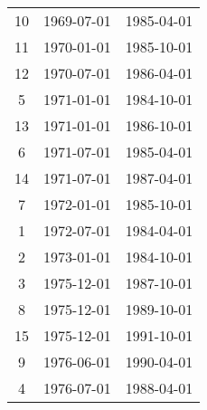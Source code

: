% 
\begin{tabular}{ccc}
  \hline
  \hline
10 & 1969-07-01 & 1985-04-01 \\ 
  11 & 1970-01-01 & 1985-10-01 \\ 
  12 & 1970-07-01 & 1986-04-01 \\ 
  5 & 1971-01-01 & 1984-10-01 \\ 
  13 & 1971-01-01 & 1986-10-01 \\ 
  6 & 1971-07-01 & 1985-04-01 \\ 
  14 & 1971-07-01 & 1987-04-01 \\ 
  7 & 1972-01-01 & 1985-10-01 \\ 
  1 & 1972-07-01 & 1984-04-01 \\ 
  2 & 1973-01-01 & 1984-10-01 \\ 
  3 & 1975-12-01 & 1987-10-01 \\ 
  8 & 1975-12-01 & 1989-10-01 \\ 
  15 & 1975-12-01 & 1991-10-01 \\ 
  9 & 1976-06-01 & 1990-04-01 \\ 
  4 & 1976-07-01 & 1988-04-01 \\ 
   \hline
\end{tabular}
